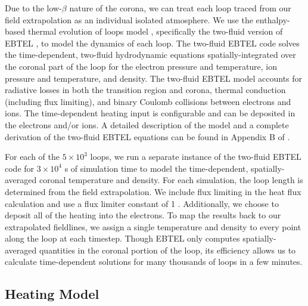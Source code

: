 Due to the low-$\beta$ nature of the corona, we can treat each loop traced from our field extrapolation as an individual isolated atmosphere. We use the enthalpy-based thermal evolution of loops model \citep[EBTEL][]{klimchuk_highly_2008,cargill_enthalpy-based_2012,cargill_enthalpy-based_2012-1}, specifically the two-fluid version of EBTEL \citep{barnes_inference_2016}, to model the dynamics of each loop. The two-fluid EBTEL code solves the time-dependent, two-fluid hydrodynamic equations spatially-integrated over the coronal part of the loop for the electron pressure and temperature, ion pressure and temperature, and density. The two-fluid EBTEL model accounts for radiative losses in both the transition region and corona, thermal conduction (including flux limiting), and binary Coulomb collisions between electrons and ions. The time-dependent heating input is configurable and can be deposited in the electrons and/or ions. A detailed description of the model and a complete derivation of the two-fluid EBTEL equations can be found in Appendix B of \citet{barnes_inference_2016}.

For each of the $5\times10^3$ loops, we run a separate instance of the two-fluid EBTEL code for $3\times10^4$ s of simulation time to model the time-dependent, spatially-averaged coronal temperature and density. For each simulation, the loop length is determined from the field extrapolation. We include flux limiting in the heat flux calculation and use a flux limiter constant of 1 \citep[see Eqs. 21 and 22 of][]{klimchuk_highly_2008}. Additionally, we choose to deposit all of the heating into the electrons. To map the results back to our extrapolated fieldlines, we assign a single temperature and density to every point along the loop at each timestep. Though EBTEL only computes spatially-averaged quantities in the coronal portion of the loop, its efficiency allows us to calculate time-dependent solutions for many thousands of loops in a few minutes. 

\subsection{Heating Model}\label{heating}

